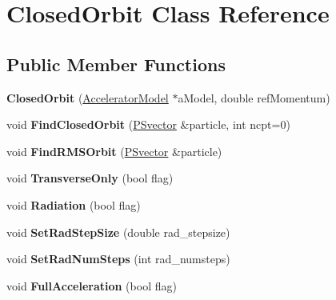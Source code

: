 \hypertarget{classClosedOrbit}{}\section{Closed\+Orbit Class Reference}
\label{classClosedOrbit}
\subsection*{Public Member Functions}
\begin{DoxyCompactItemize}
\item 
\mbox{\label{classClosedOrbit_afbbe124fdc603de514cce959fc90db02}} 
{\bfseries Closed\+Orbit} (\hyperlink{classAcceleratorModel}{Accelerator\+Model} $\ast$a\+Model, double ref\+Momentum)
\item 
\mbox{\label{classClosedOrbit_ace9fda3eec47500e4a1ff0d5e301020c}} 
void {\bfseries Find\+Closed\+Orbit} (\hyperlink{classPSvector}{P\+Svector} \&particle, int ncpt=0)
\item 
\mbox{\label{classClosedOrbit_aca682dc3a765e0c329593105e03da6ed}} 
void {\bfseries Find\+R\+M\+S\+Orbit} (\hyperlink{classPSvector}{P\+Svector} \&particle)
\item 
\mbox{\label{classClosedOrbit_a5227f58329058be8e35a060eb6721e31}} 
void {\bfseries Transverse\+Only} (bool flag)
\item 
\mbox{\label{classClosedOrbit_a87667981d76fec5dce8ec8d213fa0739}} 
void {\bfseries Radiation} (bool flag)
\item 
\mbox{\label{classClosedOrbit_aeb1d11fe50153fd03912e2a890669acb}} 
void {\bfseries Set\+Rad\+Step\+Size} (double rad\+\_\+stepsize)
\item 
\mbox{\label{classClosedOrbit_ac0f99b1c811c309f41632c12a77cd68d}} 
void {\bfseries Set\+Rad\+Num\+Steps} (int rad\+\_\+numsteps)
\item 
\mbox{\label{classClosedOrbit_a9b77f7e8be310ffbb305a9c0b426c16e}} 
void {\bfseries Full\+Acceleration} (bool flag)
\item 
\mbox{\label{classClosedOrbit_a66bccb6696d84ae18835d1ba026f6d8a}} 

\end{DoxyCompactItemize}
